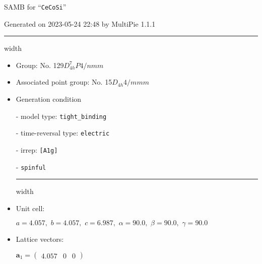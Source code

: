 \documentclass[fleqn,10pt,landscape]{article}
\begin{document}
\setcounter{MaxMatrixCols}{16}

\setlength{\baselineskip}{16pt}
\footnotesize
\begin{center}
\LARGE
SAMB for ``\texttt{CeCoSi}''
\end{center}
\begin{flushright}
Generated on 2023-05-24 22:48 by MultiPie 1.1.1
\end{flushright}
\vspace{1cm}


 \hfil \hrule height 1mm width \textwidth \hfil

\begin{itemize}
\item Group: No. 129\quad$D_{4h}^{7}$\quad$P4/nmm$\quad[ tetragonal ]

\item Associated point group: No. 15\quad$D_{4h}$\quad$4/mmm$\quad[ tetragonal ]

\vspace{5mm}

\item Generation condition

\quad - model type: \texttt{tight_binding}

\quad - time-reversal type: \texttt{electric}

\quad - irrep: \texttt{[A1g]}

\quad - \texttt{spinful}


 \hfil \hrule height 1mm width \textwidth \hfil

\item Unit cell:

\quad $a=4.057,\,\, b=4.057,\,\, c=6.987,\,\, \alpha=90.0,\,\, \beta=90.0,\,\, \gamma=90.0$

\item Lattice vectors:

\quad $\bm{a}_1=\begin{pmatrix} 4.057 & 0 & 0 \end{pmatrix}$


\end{itemize}
\end{document}
